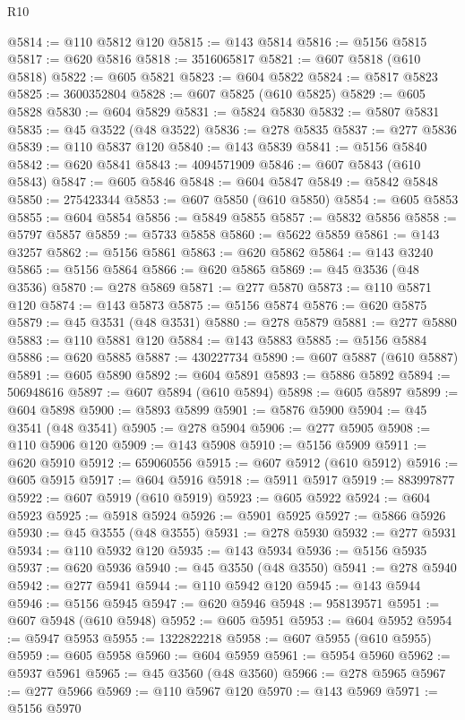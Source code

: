 \begin{lexlean}{R10}
\begin{coremodule}
@5814 := @110 @5812 @120
@5815 := @143 @5814
@5816 := @5156 @5815
@5817 := @620 @5816
@5818 := 3516065817
@5821 := @607 @5818 (@610 @5818)
@5822 := @605 @5821
@5823 := @604 @5822
@5824 := @5817 @5823
@5825 := 3600352804
@5828 := @607 @5825 (@610 @5825)
@5829 := @605 @5828
@5830 := @604 @5829
@5831 := @5824 @5830
@5832 := @5807 @5831
@5835 := @45 @3522 (@48 @3522)
@5836 := @278 @5835
@5837 := @277 @5836
@5839 := @110 @5837 @120
@5840 := @143 @5839
@5841 := @5156 @5840
@5842 := @620 @5841
@5843 := 4094571909
@5846 := @607 @5843 (@610 @5843)
@5847 := @605 @5846
@5848 := @604 @5847
@5849 := @5842 @5848
@5850 := 275423344
@5853 := @607 @5850 (@610 @5850)
@5854 := @605 @5853
@5855 := @604 @5854
@5856 := @5849 @5855
@5857 := @5832 @5856
@5858 := @5797 @5857
@5859 := @5733 @5858
@5860 := @5622 @5859
@5861 := @143 @3257
@5862 := @5156 @5861
@5863 := @620 @5862
@5864 := @143 @3240
@5865 := @5156 @5864
@5866 := @620 @5865
@5869 := @45 @3536 (@48 @3536)
@5870 := @278 @5869
@5871 := @277 @5870
@5873 := @110 @5871 @120
@5874 := @143 @5873
@5875 := @5156 @5874
@5876 := @620 @5875
@5879 := @45 @3531 (@48 @3531)
@5880 := @278 @5879
@5881 := @277 @5880
@5883 := @110 @5881 @120
@5884 := @143 @5883
@5885 := @5156 @5884
@5886 := @620 @5885
@5887 := 430227734
@5890 := @607 @5887 (@610 @5887)
@5891 := @605 @5890
@5892 := @604 @5891
@5893 := @5886 @5892
@5894 := 506948616
@5897 := @607 @5894 (@610 @5894)
@5898 := @605 @5897
@5899 := @604 @5898
@5900 := @5893 @5899
@5901 := @5876 @5900
@5904 := @45 @3541 (@48 @3541)
@5905 := @278 @5904
@5906 := @277 @5905
@5908 := @110 @5906 @120
@5909 := @143 @5908
@5910 := @5156 @5909
@5911 := @620 @5910
@5912 := 659060556
@5915 := @607 @5912 (@610 @5912)
@5916 := @605 @5915
@5917 := @604 @5916
@5918 := @5911 @5917
@5919 := 883997877
@5922 := @607 @5919 (@610 @5919)
@5923 := @605 @5922
@5924 := @604 @5923
@5925 := @5918 @5924
@5926 := @5901 @5925
@5927 := @5866 @5926
@5930 := @45 @3555 (@48 @3555)
@5931 := @278 @5930
@5932 := @277 @5931
@5934 := @110 @5932 @120
@5935 := @143 @5934
@5936 := @5156 @5935
@5937 := @620 @5936
@5940 := @45 @3550 (@48 @3550)
@5941 := @278 @5940
@5942 := @277 @5941
@5944 := @110 @5942 @120
@5945 := @143 @5944
@5946 := @5156 @5945
@5947 := @620 @5946
@5948 := 958139571
@5951 := @607 @5948 (@610 @5948)
@5952 := @605 @5951
@5953 := @604 @5952
@5954 := @5947 @5953
@5955 := 1322822218
@5958 := @607 @5955 (@610 @5955)
@5959 := @605 @5958
@5960 := @604 @5959
@5961 := @5954 @5960
@5962 := @5937 @5961
@5965 := @45 @3560 (@48 @3560)
@5966 := @278 @5965
@5967 := @277 @5966
@5969 := @110 @5967 @120
@5970 := @143 @5969
@5971 := @5156 @5970

\end{coremodule}
\end{lexlean}
